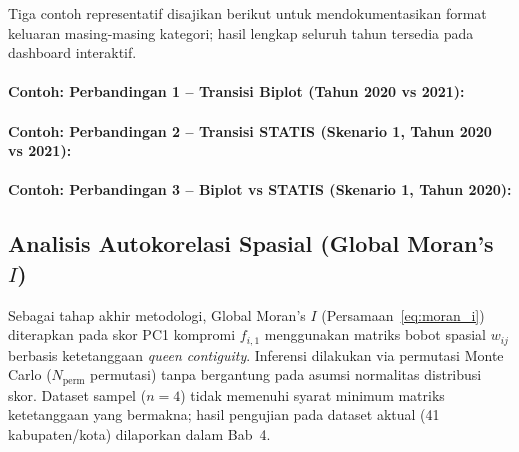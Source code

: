 Tiga contoh representatif disajikan berikut untuk mendokumentasikan format keluaran masing-masing kategori; hasil lengkap seluruh tahun tersedia pada dashboard interaktif.

{\makeatletter\let\label\@gobble\makeatother
\paragraph{Contoh: Perbandingan 1 -- Transisi Biplot (Tahun 2020 vs 2021):}



\paragraph{Contoh: Perbandingan 2 -- Transisi STATIS (Skenario 1, Tahun 2020 vs 2021):}


\paragraph{Contoh: Perbandingan 3 -- Biplot vs STATIS (Skenario 1, Tahun 2020):}


}


\subsection{\normalsize Analisis Autokorelasi Spasial (Global Moran's~\texorpdfstring{$I$}{I})}
Sebagai tahap akhir metodologi, Global Moran's $I$ (Persamaan~\ref{eq:moran_i}) diterapkan pada skor PC1 kompromi $f_{i,1}$ menggunakan matriks bobot spasial $w_{ij}$ berbasis ketetanggaan \textit{queen contiguity}. Inferensi dilakukan via permutasi Monte Carlo ($N_{\text{perm}}$ permutasi) tanpa bergantung pada asumsi normalitas distribusi skor. Dataset sampel ($n=4$) tidak memenuhi syarat minimum matriks ketetanggaan yang bermakna; hasil pengujian pada dataset aktual (41 kabupaten/kota) dilaporkan dalam Bab~4.
